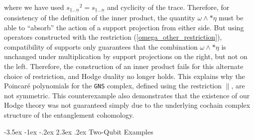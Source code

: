 \documentclass[12pt]{article}
\makeatletter
\newcommand{\ul}[1]{{\underline{#1}}}
\renewcommand\section{\@startsection {section}{1}{\z@}%
                                   {-3.5ex \@plus -1ex \@minus -.2ex}%
                                   {2.3ex \@plus.2ex}%
                                   {\normalfont\large\bfseries}}
\numberwithin{equation}{section}
\newcommand{\soneton}{{s_{\ul{1} \ldots \ul{n}}}}
\makeatother
\begin{document}
%
where we have used $\soneton^2 = \soneton$ and cyclicity of the trace. Therefore, for consistency of the definition of the inner product, the quantity $\omega \wedge \ast \eta $ must be able to ``absorb'' the action of a support projection from either side. But using operators constructed with the restriction (\ref{omega_other_restriction}), compatibility of supports only guarantees that the combination $\omega \wedge \ast \eta $ is unchanged under multiplication by support projections on the right, but not on the left. Therefore, the construction of an inner product fails for this alternate choice of restriction, and Hodge duality no longer holds. This explains why the Poincar\'e polynomials for the \texttt{GNS} complex, defined using the restriction $\big\|$, are not symmetric. This counterexample also demonstrates that the existence of our Hodge theory was not guaranteed simply due to the underlying cochain complex structure of the entanglement cohomology.







\section{Two-Qubit Examples}\label{sec:two_qubit_example}
\end{document}
